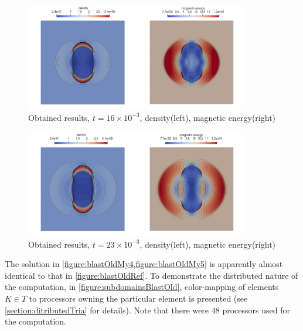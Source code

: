 \begin{figure}[H]
	\begin{center}
		\includegraphics[width=0.87\textwidth]{img/mhd-blast/old/mynew4.jpg}
	\caption{Obtained results, $t = 16\times 10^{-3}$, density(left), magnetic energy(right)}
	\label{figure:blastOldMy4}
	\end{center}
\end{figure}
\vspace{-8mm}

\begin{figure}[H]
	\begin{center}
		\includegraphics[width=0.87\textwidth]{img/mhd-blast/old/mynew5.jpg}
	\caption{Obtained results, $t = 23\times 10^{-3}$, density(left), magnetic energy(right)}
	\label{figure:blastOldMy5}
	\end{center}
\end{figure}
\vspace{-5mm}
The solution in \cref{figure:blastOldMy4,figure:blastOldMy5}  is apparently almost identical to that in \cref{figure:blastOldRef}. To demonstrate the distributed nature of the computation, in \cref{figure:subdomainsBlastOld}, color-mapping of elements $K \in T$ to processors owning the particular element is presented (see \cref{section:ditributedTria} for details). Note that there were $48$ processors used for the computation.

